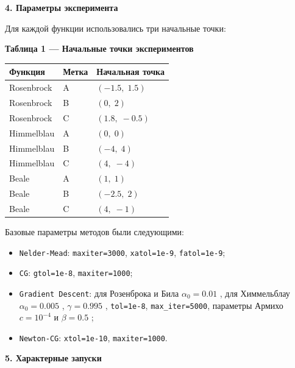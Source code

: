 \documentclass[12pt]{article}
\begin{document}
\begin{large}
\par \textbf{4. Параметры эксперимента}

\par Для каждой функции использовались три начальные точки:
\begin{center}
\textbf{Таблица 1 --- Начальные точки экспериментов}
\end{center}

\small
\begin{longtable}{|p{3.3cm}|p{2.2cm}|p{7.5cm}|}
\hline
\textbf{Функция} & \textbf{Метка} & \textbf{Начальная точка} \\ 
\hline
Rosenbrock & A & $(-1.5,\;1.5)$ \\ \hline
Rosenbrock & B & $(0,\;2)$ \\ \hline
Rosenbrock & C & $(1.8,\;-0.5)$ \\ \hline
Himmelblau & A & $(0,\;0)$ \\ \hline
Himmelblau & B & $(-4,\;4)$ \\ \hline
Himmelblau & C & $(4,\;-4)$ \\ \hline
Beale & A & $(1,\;1)$ \\ \hline
Beale & B & $(-2.5,\;2)$ \\ \hline
Beale & C & $(4,\;-1)$ \\ \hline
\end{longtable}
\normalsize

\par Базовые параметры методов были следующими:
\begin{itemize}
    \item \texttt{Nelder-Mead}: \texttt{maxiter=3000}, \texttt{xatol=1e-9}, \texttt{fatol=1e-9};
    \item \texttt{CG}: \texttt{gtol=1e-8}, \texttt{maxiter=1000};
    \item \texttt{Gradient Descent}: для Розенброка и Била  $\alpha_0=0.01$ , для Химмельблау  $\alpha_0=0.005$ ,  $\gamma=0.995$ , \texttt{tol=1e-8}, \texttt{max\_iter=5000}, параметры Армихо  $c=10^{-4}$  и  $\beta=0.5$ ;
    \item \texttt{Newton-CG}: \texttt{xtol=1e-10}, \texttt{maxiter=1000}.
\end{itemize}

\par \textbf{5. Характерные запуски}


\end{large}
\end{document}
